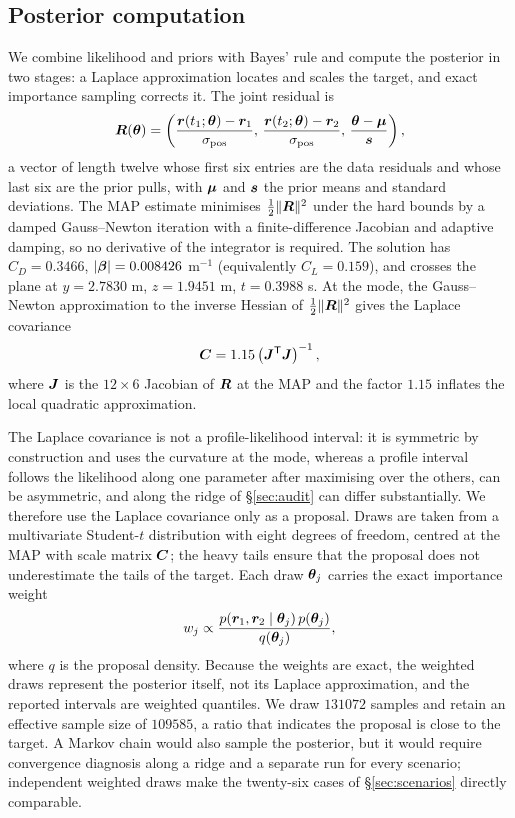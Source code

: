 \subsection{Posterior computation}
\label{sec:sampling}

We combine likelihood and priors with Bayes' rule and compute the posterior in
two stages: a Laplace approximation locates and scales the target, and exact
importance sampling corrects it. The joint residual is
\begin{equation}
  \bm{R}(\bm{\theta})=\left(
  \frac{\bm{r}(t_1;\bm{\theta})-\bm{r}_1}{\sigma_{\rm pos}},\,
  \frac{\bm{r}(t_2;\bm{\theta})-\bm{r}_2}{\sigma_{\rm pos}},\,
  \frac{\bm{\theta}-\bm{\mu}}{\bm{s}}\right),
  \label{eq:residual}
\end{equation}
a vector of length twelve whose first six entries are the data residuals and
whose last six are the prior pulls, with $\bm{\mu}$ and $\bm{s}$ the prior
means and standard deviations. The MAP estimate minimises
$\tfrac12\|\bm{R}\|^2$ under the hard bounds by a damped Gauss--Newton iteration
with a finite-difference Jacobian and adaptive damping, so no derivative of the
integrator is required. The solution has $C_D=0.3466$,
$|\bm{\beta}|=0.008426$ m$^{-1}$ (equivalently $C_L=0.159$), and crosses the
plane at $y=2.7830$ m, $z=1.9451$ m, $t=0.3988$ s. At the mode, the
Gauss--Newton approximation to the inverse Hessian of $\tfrac12\|\bm{R}\|^2$
gives the Laplace covariance
\begin{equation}
  \bm{C}=1.15\left(\bm{J}^{\mathsf T}\bm{J}\right)^{-1},
  \label{eq:laplace}
\end{equation}
where $\bm{J}$ is the $12\times6$ Jacobian of $\bm{R}$ at the MAP and the
factor $1.15$ inflates the local quadratic approximation.

The Laplace covariance is not a profile-likelihood interval: it is symmetric by
construction and uses the curvature at the mode, whereas a profile interval
follows the likelihood along one parameter after maximising over the others, can
be asymmetric, and along the ridge of \S\ref{sec:audit} can differ
substantially. We therefore use the Laplace covariance only as a proposal. Draws are taken from a multivariate Student-$t$ distribution with
eight degrees of freedom, centred at the MAP with scale matrix $\bm{C}$; the
heavy tails ensure that the proposal does not underestimate the tails of the
target. Each draw $\bm{\theta}_j$ carries the exact importance weight
\begin{equation}
  w_j\propto\frac{p(\bm{r}_1,\bm{r}_2\mid\bm{\theta}_j)\,p(\bm{\theta}_j)}
  {q(\bm{\theta}_j)},
  \label{eq:weights}
\end{equation}
where $q$ is the proposal density. Because the weights are exact, the weighted
draws represent the posterior itself, not its Laplace approximation, and the
reported intervals are weighted quantiles. We draw $131072$ samples and retain
an effective sample size of $109585$, a ratio that indicates the proposal is
close to the target. A Markov chain would also sample the posterior, but it
would require convergence diagnosis along a ridge and a separate run for every
scenario; independent weighted draws make the twenty-six cases of
\S\ref{sec:scenarios} directly comparable.

